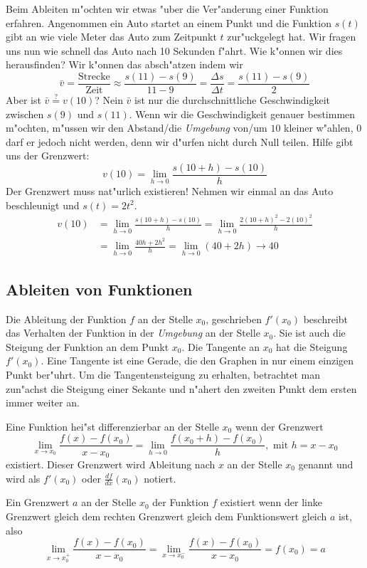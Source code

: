 Beim Ableiten m"ochten wir etwas "uber die Ver"anderung einer Funktion erfahren. Angenommen ein Auto startet an einem Punkt und die Funktion $s(t)$ gibt an wie viele Meter das Auto zum Zeitpunkt $t$ zur"uckgelegt hat. Wir fragen uns nun wie schnell das Auto nach 10 Sekunden f"ahrt. Wie k"onnen wir dies herausfinden? Wir k"onnen das absch"atzen indem wir 
\begin{equation*}
\bar{v} = \frac{\text{Strecke}}{\text{Zeit}} \approx \frac{s(11) - s(9)}{11 - 9} = \frac{\Delta s}{\Delta t} = \frac{s(11) - s(9)}{2}
\end{equation*}
Aber ist $\bar{v} \stackrel{?}{=} v(10)$? Nein $\bar{v}$ ist nur die durchschnittliche Geschwindigkeit zwischen $s(9)$ und $s(11)$. Wenn wir die Geschwindigkeit genauer bestimmen m"ochten, m"ussen wir den Abstand/die \textit{Umgebung} von/um $10$ kleiner w"ahlen, $0$ darf er jedoch nicht werden, denn wir d"urfen nicht durch Null teilen. Hilfe gibt uns der Grenzwert:
\begin{equation*}
v(10) = \lim\limits_{h \to 0} \frac{s(10+h) - s(10)}{h}
\end{equation*}
Der Grenzwert muss nat"urlich existieren! Nehmen wir einmal an das Auto beschleunigt und $s(t) = 2 t^2$.
\begin{align*}
v(10) &= \lim\limits_{h \to 0} \frac{s(10+h) - s(10)}{h} = \lim\limits_{h \to 0} \frac{2 (10+h)^2 - 2 (10)^2}{h}\\
&= \lim\limits_{h \to 0} \frac{40h + 2h^2}{h} = \lim\limits_{h \to 0}(40 + 2h) \to 40
\end{align*}

\subsection{Ableiten von Funktionen}
Die Ableitung der Funktion $f$ an der Stelle $x_0$, geschrieben $f'(x_0)$ beschreibt das Verhalten der Funktion in der \textit{Umgebung} an der Stelle $x_0$. Sie ist auch die Steigung der Funktion an dem Punkt $x_0$. Die Tangente an $x_0$ hat die Steigung $f'(x_0)$. Eine Tangente ist eine Gerade, die den Graphen in nur einem einzigen Punkt ber"uhrt. Um die Tangentensteigung zu erhalten, betrachtet man zun"achst die Steigung einer Sekante und n"ahert den zweiten Punkt dem ersten immer weiter an.
\begin{definition}[Differenzierbarkeit in $x_0$]
Eine Funktion hei"st differenzierbar an der Stelle $x_0$ wenn der Grenzwert
\begin{equation*}
 \lim\limits_{x \to x_0} \frac{f(x)-f(x_0)}{x-x_0} = \lim\limits_{h \to 0}  \frac{f(x_0 + h)-f(x_0)}{h} , \text{ mit } h = x - x_0
\end{equation*}
existiert. Dieser Grenzwert wird Ableitung nach $x$ an der Stelle $x_0$ genannt und wird als $f'(x_0)$ oder $\frac{df}{dx}(x_0)$ notiert.
\end{definition}
Ein Grenzwert $a$ an der Stelle $x_0$ der Funktion $f$ existiert wenn der linke Grenzwert gleich dem rechten Grenzwert gleich dem Funktionswert gleich $a$ ist, also
\begin{equation*}
 \lim\limits_{x \to x_0^+} \frac{f(x)-f(x_0)}{x-x_0} =  \lim\limits_{x \to x_0^-} \frac{f(x)-f(x_0)}{x-x_0} = f(x_0) = a
\end{equation*}

